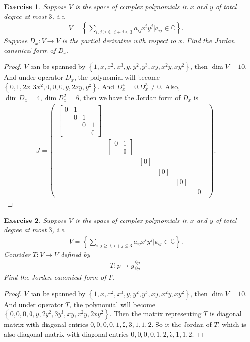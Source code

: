 \documentclass[11pt]{book}
\newtheorem{exercise}{Exercise}[section]
\theoremstyle{definition}
\numberwithin{equation}{chapter}
\begin{document}
\begin{exercise}
Suppose $V$ is the space of complex polynomials in $x$ and $y$ of total degree at most $3$, i.e.
\begin{align*}
    V = \left\{\sum_{i,j \geq 0, \,\, i+j \leq 3} a_{ij} x^i y^j \Bigg| a_{ij} \in \mathbb{C} \right\}.
\end{align*}
Suppose $D_x: V \to V$ is the partial derivative with respect to $x$. Find the Jordan canonical form of $D_x$.
\end{exercise}
\begin{proof}
$V$ can be spanned by $\left\{1, x, x^2, x^3, y, y^2, y^3, xy, x^2y, xy^2\right\}$, then $\dim V = 10$. And under operator $D_x$, the polynomial will become $\left\{0, 1, 2x, 3x^2, 0, 0, 0, y, 2xy, y^2\right\}$. And $D_x^4 = 0. D_x^3 \neq 0$. Also, $\dim D_x = 4, \dim D_x^2 = 6$, then we have the Jordan form of $D_x$ is
\begin{align*}
    J = \begin{pmatrix}
        \begin{bmatrix}
            0 & 1 &   & \\
              & 0 & 1 & \\
              &   & 0 & 1 \\
              &   &   & 0
        \end{bmatrix} &  &  &  &  & \\
        & \begin{bmatrix}
            0 & 1 \\
              & 0
        \end{bmatrix} &  &  &  & \\
        &  & [0] &  &  & \\
        &  &  & [0] &  & \\
        &  &  &  & [0] & \\
        &  &  &  &  & [0]
    \end{pmatrix}.
\end{align*}
\end{proof}

\medskip

\begin{exercise}
Suppose $V$ is the space of complex polynomials in $x$ and $y$ of total degree at most $3$, i.e.
\begin{align*}
    V = \left\{\sum_{i,j \geq 0,\,i+j \leq 3} a_{ij} x^i y^j \Bigg| a_{ij} \in \mathbb{C} \right\}.
\end{align*}
Consider $T: V \to V$ defined by 
\begin{align*}
    T: p \mapsto y \frac{\partial p}{\partial y}.
\end{align*}
Find the Jordan canonical form of $T$.
\end{exercise}
\begin{proof}
$V$ can be spanned by $\left\{1, x, x^2, x^3, y, y^2, y^3, xy, x^2y, xy^2\right\}$, then $\dim V = 10$. And under operator $T$, the polynomial will become $\left\{0, 0, 0, 0, y, 2y^2, 3y^3, xy, x^2y, 2xy^2\right\}$. Then the matrix representing $T$ is diagonal matrix with diagonal entries $0,0,0,0,1,2,3,1,1,2$. So it the Jordan of $T$, which is also diagonal matrix with diagonal entries $0,0,0,0,1,2,3,1,1,2$.
\end{proof}
\end{document}
